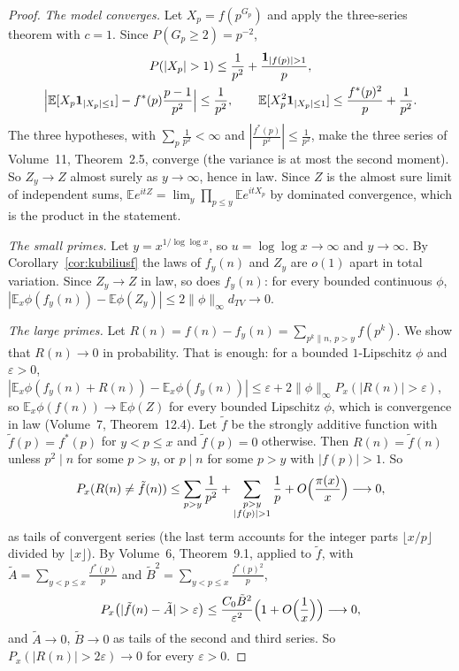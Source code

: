 \begin{proof}
\emph{The model converges.} Let $X_p=f(p^{G_p})$ and apply the three-series theorem with $c=1$. Since $P(G_p\ge2)=p^{-2}$,
\[
\begin{gathered}P(|X_p|>1)\le\frac1{p^2}+\frac{\mathbf 1_{|f(p)|>1}}p,\\\Bigl|\mathbb E[X_p\mathbf 1_{|X_p|\le1}]-f^*(p)\frac{p-1}{p^2}\Bigr|\le\frac1{p^2},\qquad\mathbb E[X_p^2\mathbf 1_{|X_p|\le1}]\le\frac{f^*(p)^2}p+\frac1{p^2}.\end{gathered}
\]
The three hypotheses, with $\sum_p\frac1{p^2}<\infty$ and $|\frac{f^*(p)}{p^2}|\le\frac1{p^2}$, make the three series of Volume~11, Theorem~2.5, converge (the variance is at most the second moment). So $Z_y\to Z$ almost surely as $y\to\infty$, hence in law. Since $Z$ is the almost sure limit of independent sums, $\mathbb Ee^{itZ}=\lim_y\prod_{p\le y}\mathbb Ee^{itX_p}$ by dominated convergence, which is the product in the statement.

\emph{The small primes.} Let $y=x^{1/\log\log x}$, so $u=\log\log x\to\infty$ and $y\to\infty$. By Corollary~\ref{cor:kubiliusf} the laws of $f_y(n)$ and $Z_y$ are $o(1)$ apart in total variation. Since $Z_y\to Z$ in law, so does $f_y(n)$: for every bounded continuous $\phi$, $|\mathbb E_x\phi(f_y(n))-\mathbb E\phi(Z_y)|\le2\|\phi\|_\infty d_{TV}\to0$.

\emph{The large primes.} Let $R(n)=f(n)-f_y(n)=\sum_{p^k\parallel n,\,p>y}f(p^k)$. We show that $R(n)\to0$ in probability. That is enough: for a bounded $1$-Lipschitz $\phi$ and $\varepsilon>0$, $|\mathbb E_x\phi(f_y(n)+R(n))-\mathbb E_x\phi(f_y(n))|\le\varepsilon+2\|\phi\|_\infty P_x(|R(n)|>\varepsilon)$, so $\mathbb E_x\phi(f(n))\to\mathbb E\phi(Z)$ for every bounded Lipschitz $\phi$, which is convergence in law (Volume~7, Theorem~12.4). Let $\tilde f$ be the strongly additive function with $\tilde f(p)=f^*(p)$ for $y<p\le x$ and $\tilde f(p)=0$ otherwise. Then $R(n)=\tilde f(n)$ unless $p^2\mid n$ for some $p>y$, or $p\mid n$ for some $p>y$ with $|f(p)|>1$. So
\[
P_x(R(n)\ne\tilde f(n))\le\sum_{p>y}\frac1{p^2}+\sum_{\substack{p>y\\|f(p)|>1}}\frac1p+O\Bigl(\frac{\pi(x)}x\Bigr)\longrightarrow0,
\]
as tails of convergent series (the last term accounts for the integer parts $\lfloor x/p\rfloor$ divided by $\lfloor x\rfloor$). By Volume~6, Theorem~9.1, applied to $\tilde f$, with $\tilde A=\sum_{y<p\le x}\frac{f^*(p)}p$ and $\tilde B^2=\sum_{y<p\le x}\frac{f^*(p)^2}p$,
\[
P_x\bigl(|\tilde f(n)-\tilde A|>\varepsilon\bigr)\le\frac{C_0\tilde B^2}{\varepsilon^2}\Bigl(1+O\Bigl(\frac1x\Bigr)\Bigr)\longrightarrow0,
\]
and $\tilde A\to0$, $\tilde B\to0$ as tails of the second and third series. So $P_x(|R(n)|>2\varepsilon)\to0$ for every $\varepsilon>0$.
\end{proof}

